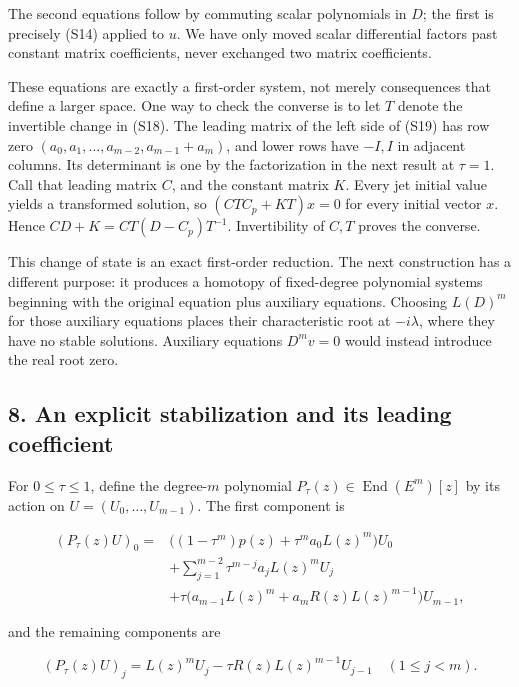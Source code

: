 \documentclass[
  11pt,
]{article}
\begin{document}
The second equations follow by commuting scalar polynomials in \(D\);
the first is precisely (S14) applied to \(u\). We have only moved scalar
differential factors past constant matrix coefficients, never exchanged
two matrix coefficients.

These equations are exactly a first-order system, not merely
consequences that define a larger space. One way to check the converse
is to let \(T\) denote the invertible change in (S18). The leading
matrix of the left side of (S19) has row zero
\((a_0,a_1,\ldots,a_{m-2},a_{m-1}+a_m)\), and lower rows have \(-I,I\)
in adjacent columns. Its determinant is one by the factorization in the
next result at \(\tau=1\). Call that leading matrix \(C\), and the
constant matrix \(K\). Every jet initial value yields a transformed
solution, so \((CTC_p+KT)x=0\) for every initial vector \(x\). Hence
\(CD+K=CT(D-C_p)T^{-1}\). Invertibility of \(C,T\) proves the converse.

This change of state is an exact first-order reduction. The next
construction has a different purpose: it produces a homotopy of
fixed-degree polynomial systems beginning with the original equation
plus auxiliary equations. Choosing \(L(D)^m\) for those auxiliary
equations places their characteristic root at \(-i\lambda\), where they
have no stable solutions. Auxiliary equations \(D^m v=0\) would instead
introduce the real root zero.

\subsection{8. An explicit stabilization and its leading
coefficient}\label{an-explicit-stabilization-and-its-leading-coefficient}

For \(0\leq\tau\leq1\), define the degree-\(m\) polynomial
\(P_\tau(z)\in\operatorname{End}(E^m)[z]\) by its action on
\(U=(U_0,\ldots,U_{m-1})\). The first component is

\[
\begin{aligned}
(P_\tau(z)U)_0={}&
\big((1-\tau^m)p(z)+\tau^m a_0L(z)^m\big)U_0\\
&+\sum_{j=1}^{m-2}\tau^{m-j}a_jL(z)^mU_j\\
&+\tau\big(a_{m-1}L(z)^m+a_mR(z)L(z)^{m-1}\big)U_{m-1},
\end{aligned}                                             \tag{S20}
\]

and the remaining components are

\[
(P_\tau(z)U)_j=L(z)^mU_j-
\tau R(z)L(z)^{m-1}U_{j-1}\quad(1\leq j<m).               \tag{S21}
\]
\end{document}
